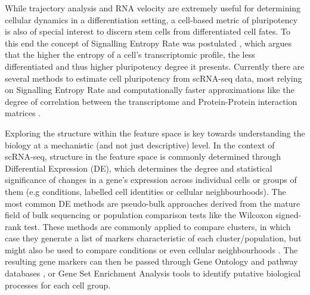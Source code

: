 While trajectory analysis and RNA velocity are extremely useful for determining cellular dynamics in a differentiation setting, a cell-based metric of pluripotency is also of special interest to discern stem cells from differentiated cell fates. To this end the concept of Signalling Entropy Rate was postulated \cite{teschendorff_signalling_2014}, which argues that the higher the entropy of a cell's transcriptomic profile, the less differentiated and thus higher pluripotency degree it presents. Currently there are several methods to estimate cell pluripotency from scRNA-seq data, most relying on Signalling Entropy Rate and computationally faster approximations like the degree of correlation between the transcriptome and Protein-Protein interaction matrices \cite{teschendorff_single-cell_2017,gulati_single-cell_2020,senra_origins_2022}. 

Exploring the structure within the feature space is key towards understanding the biology at a mechanistic (and not just descriptive) level. In the context of scRNA-seq, structure in the feature space is commonly determined through Differential Expression (DE), which determines the degree and statistical significance of changes in a gene's expression across individual cells or groups of them (e.g conditions, labelled cell identities or cellular neighbourhoods). The most common DE methods are pseudo-bulk approaches derived from the mature field of bulk sequencing \cite{robinson_edger_2010,finak_mast_2015} or population comparison tests like the Wilcoxon signed-rank test. These methods are commonly applied to compare clusters, in which case they generate a list of markers characteristic of each cluster/population, but might also be used to compare conditions or even cellular neighbourhoods \cite{missarova_sensitive_2023}. The resulting gene markers can then be passed through Gene Ontology \cite{ashburner_gene_2000} and pathway databases \cite{kanehisa_kegg_2017,turei_integrated_2021,gillespie_reactome_2022}, or Gene Set Enrichment Analysis tools \cite{subramanian_gene_2005} to identify putative biological processes for each cell group. 

